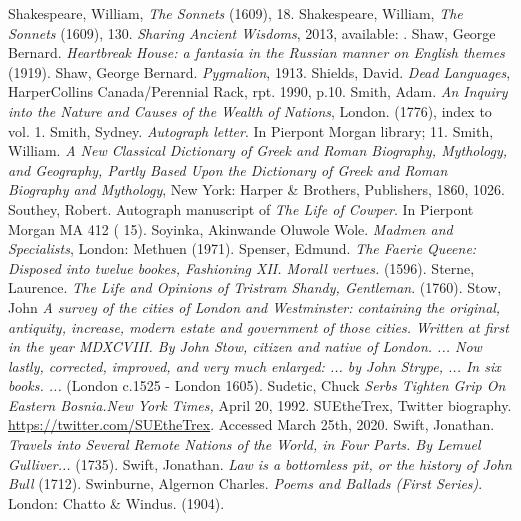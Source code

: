 \begin{bibitemlist}{1}
 Shakespeare, William, \textit{The Sonnets} (1609), 18.
 Shakespeare, William, \textit{The Sonnets} (1609), 130.
 \textit{Sharing Ancient Wisdoms}, 2013, available: .
 Shaw, George Bernard. \textit{Heartbreak House: a fantasia in the Russian manner on English themes} (1919).
 Shaw, George Bernard. \textit{Pygmalion}, 1913.
 Shields, David. \textit{Dead Languages}, HarperCollins Canada/Perennial Rack, rpt. 1990, p.10.
 Smith, Adam. \textit{An Inquiry into the Nature and Causes of the Wealth of Nations}, London. (1776), index to vol. 1.
 Smith, Sydney. \textit{Autograph letter}. In Pierpont Morgan library; \cite{KLINKENBORG} 11.
 Smith, William. \textit{A New Classical Dictionary of Greek and Roman Biography, Mythology, and Geography, Partly Based Upon the Dictionary of Greek and Roman Biography and Mythology}, New York: Harper \& Brothers, Publishers, 1860, 1026.
 Southey, Robert. Autograph manuscript of \textit{The Life of Cowper}. In Pierpont Morgan MA 412 (\cite{KLINKENBORG} 15).
 Soyinka, Akinwande Oluwole Wole. \textit{Madmen and Specialists}, London: Methuen (1971).
 Spenser, Edmund. \textit{The Faerie Queene: Disposed into twelue bookes, Fashioning XII. Morall vertues.} (1596).
 Sterne, Laurence. \textit{The Life and Opinions of Tristram Shandy, Gentleman}. (1760).
 Stow, John \textit{A survey of the cities of London and Westminster: containing the original, antiquity, increase, modern estate and government of those cities. Written at first in the year MDXCVIII. By John Stow, citizen and native of London. ... Now lastly, corrected, improved, and very much enlarged: ... by John Strype, ... In six books. ...} (London c.1525 - London 1605).
 Sudetic, Chuck \textit{Serbs Tighten Grip On Eastern Bosnia.}\textit{New York Times,} April 20, 1992. 
 SUEtheTrex, Twitter biography. \url{https://twitter.com/SUEtheTrex}. Accessed March 25th, 2020.
 Swift, Jonathan. \textit{Travels into Several Remote Nations of the World, in Four Parts. By Lemuel Gulliver...} (1735).
 Swift, Jonathan. \textit{Law is a bottomless pit, or the history of John Bull} (1712).
 Swinburne, Algernon Charles. \textit{Poems and Ballads (First Series)}. London: Chatto \& Windus. (1904).

\end{bibitemlist}

